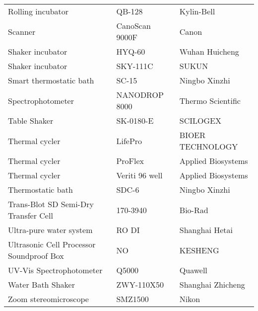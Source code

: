 \begin{longtable}{lll @{}}
Rolling incubator	&	QB-128	&	Kylin-Bell	\\
Scanner	&	CanoScan 9000F	&	Canon	\\
Shaker incubator    &   HYQ-60      &   Wuhan Huicheng\\
Shaker incubator	&	SKY-111C	&	SUKUN	\\
Smart thermostatic bath	&	SC-15	&	Ningbo Xinzhi	\\
Spectrophotometer & NANODROP 8000 & Thermo Scientific\\
Table Shaker	&	SK-0180-E	&	SCILOGEX	\\
Thermal cycler  &   LifePro   & BIOER TECHNOLOGY \\
Thermal cycler	&	ProFlex	&	Applied Biosystems	\\
Thermal cycler	&	Veriti 96 well	&	Applied Biosystems	\\
Thermostatic bath	&	SDC-6	&	Ningbo Xinzhi	\\
Trans-Blot SD Semi-Dry Transfer Cell	&	170-3940	&	Bio-Rad	\\
Ultra-pure water system	&	RO DI	&	Shanghai Hetai	\\
Ultrasonic Cell Processor Soundproof Box & NO & KESHENG \\
UV-Vis Spectrophotometer	&	Q5000	&	Quawell	\\
Water Bath Shaker & ZWY-110X50 & Shanghai Zhicheng \\
Zoom stereomicroscope	&	SMZ1500	&	Nikon	\\
\bottomrule
\end{longtable}
